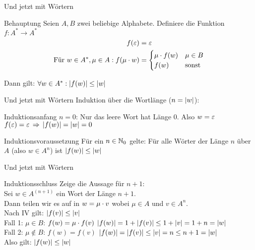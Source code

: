 \begin{frame}{Und jetzt mit Wörtern}
	\begin{block}{Behauptung}
		Seien $A, B$ zwei beliebige Alphabete. Definiere die Funktion $f: A^* \to A^*$
		\begin{align*}
			f(\varepsilon) &= \varepsilon \\
			\text{Für } w \in A^*, \mu \in A: f(\mu \cdot w) &= 
			\begin{cases}
				\mu \cdot f(w) &\mu \in B \\
				f(w) &\text{sonst}
			\end{cases}\\
		\end{align*}
	
	Dann gilt: $\forall w \in A^*: \left\lvert f(w) \right\rvert \le \left\lvert w \right\rvert$
	\end{block}
\end{frame}

\begin{frame}{Und jetzt mit Wörtern}
	Induktion über die Wortlänge ($n = \left\lvert w \right\rvert$):\\[0.5em]
	\begin{block}{Induktionsanfang}
		$n = 0$: Nur das leere Wort hat Länge 0. Also $w = \varepsilon$\\
		$f(\eps) = \eps \impl \size{f(w)} = \size w = 0$
	\end{block}
	\begin{block}{Induktionsvoraussetzung}
		Für ein $n \in \mathbb{N}_0$ gelte: Für alle Wörter der Länge $n$ über $A$ (also $w \in A^n$) ist $\left\lvert f(w) \right\rvert \le \left\lvert w \right\rvert$
	\end{block}
\end{frame}

\begin{frame}{Und jetzt mit Wörtern}

	\begin{block}{Induktionsschluss}
		Zeige die Aussage für $n+1$:\\
		Sei $w \in A^{(n+1)}$ ein Wort der Länge $n+1$.\\
		Dann teilen wir es auf in $w = \mu \cdot v$ wobei $\mu \in A$ und $v \in A^n$.\\
		Nach IV gilt: $\left\lvert f(v) \right\rvert \le \left\lvert v \right\rvert$\\
		Fall 1: $\mu \in B$: $f(w) = \mu \cdot f(v)$ \impl $\left\lvert f(w) \right\rvert = 1 + \left\lvert f(v) \right\rvert \le 1 + \left\lvert v \right\rvert = 1+n = \left\lvert w \right\rvert$\\
		Fall 2: $\mu \notin B$: $f(w) = f(v)$ \impl $\left\lvert f(w) \right\rvert = \left\lvert f(v) \right\rvert \le \left\lvert v \right\rvert = n \le n+1 = \left\lvert w \right\rvert$\\
		\smallskip
		Also gilt: $\left\lvert f(w) \right\rvert \le \left\lvert w \right\rvert$
	\end{block}
\end{frame}